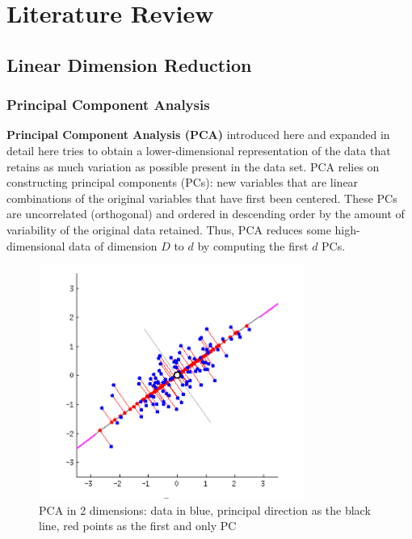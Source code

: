 \documentclass[12pt]{report}
\begin{document}
\chapter{Literature Review}

\section{Linear Dimension Reduction}

\subsection{Principal Component Analysis}

\textbf{Principal Component Analysis (PCA)} introduced
here \cite{pca} and expanded in detail here \cite{pca2} tries to obtain a 
lower-dimensional representation of the data 
that retains as much variation as possible present in the data set. 
PCA relies on constructing principal components (PCs): 
new variables that are linear combinations of the original variables 
that have first been centered.
These PCs are uncorrelated (orthogonal) and ordered in descending order 
by the amount of variability of the original data retained.
Thus, PCA reduces some high-dimensional data of dimension $D$ 
to $d$ by computing the first $d$ PCs.\\
\begin{figure}[ht]
    \begin{center}
        \includegraphics[scale=0.85]{pca_illust.PNG}
        \caption{PCA in 2 dimensions: data in blue, 
        principal direction as the black line, red points as the first 
        and only PC}
        \label{fig:PCA Illustration}
    \end{center}
\end{figure}
\end{document}
